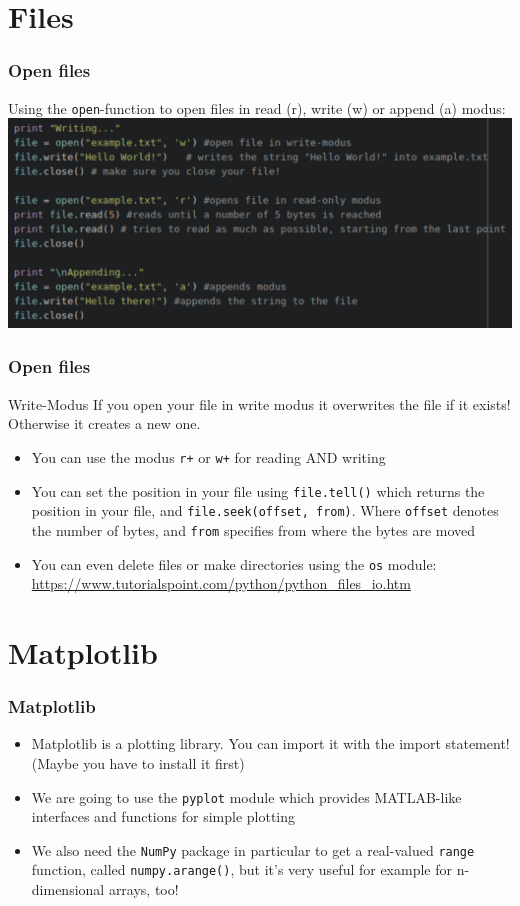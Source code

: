 \documentclass{beamer}
\begin{document}
\section{Files}

\begin{frame}
\frametitle{Open files}
	Using the \texttt{open}-function to open files in read (r), write (w) or append (a) modus:
	\includegraphics[width = 1\textwidth]{openFiles.pdf}
\end{frame}

\begin{frame}
\frametitle{Open files}
	\begin{alertblock}{Write-Modus}
	If you open your file in write modus it overwrites the file if it exists! Otherwise it creates a new one.
	\end{alertblock}
	\begin{itemize}
		\item You can use the modus \texttt{r+} or \texttt{w+} for reading AND writing
		\item You can set the position in your file using \texttt{file.tell()} which returns the position in your file, and \texttt{file.seek(offset, from)}. Where \texttt{offset} denotes the number of bytes, and \texttt{from} specifies from where the bytes are moved
		\item You can even delete files or make directories using the \texttt{os} module: \\ \url{https://www.tutorialspoint.com/python/python_files_io.htm}
	\end{itemize}
\end{frame}

\section{Matplotlib}
\begin{frame}
\frametitle{Matplotlib}
	\begin{itemize}
		\item Matplotlib is a plotting library. You can import it with the import statement! (Maybe you have to install it first)
		\item We are going to use the \texttt{pyplot} module which provides MATLAB-like interfaces and functions for simple plotting
		\item We also need the \texttt{NumPy} package in particular to get a real-valued \texttt{range} function, called \texttt{numpy.arange()}, but it's very useful for example for n-dimensional arrays, too!
	\end{itemize}
\end{frame}
\end{document}

